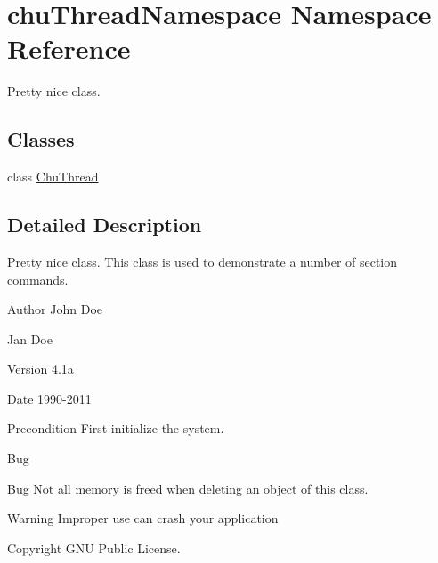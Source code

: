 \hypertarget{namespacechu_thread_namespace}{\section{chu\-Thread\-Namespace Namespace Reference}
\label{namespacechu_thread_namespace}
}


Pretty nice class.  


\subsection*{Classes}
\begin{DoxyCompactItemize}
\item 
class \hyperlink{classchu_thread_namespace_1_1_chu_thread}{Chu\-Thread}
\end{DoxyCompactItemize}


\subsection{Detailed Description}
Pretty nice class. This class is used to demonstrate a number of section commands. \begin{DoxyAuthor}{Author}
John Doe 

Jan Doe 
\end{DoxyAuthor}
\begin{DoxyVersion}{Version}
4.\-1a 
\end{DoxyVersion}
\begin{DoxyDate}{Date}
1990-\/2011 
\end{DoxyDate}
\begin{DoxyPrecond}{Precondition}
First initialize the system. 
\end{DoxyPrecond}
\begin{DoxyRefDesc}{Bug}
\item[\hyperlink{bug__bug000001}{Bug}]Not all memory is freed when deleting an object of this class. \end{DoxyRefDesc}
\begin{DoxyWarning}{Warning}
Improper use can crash your application 
\end{DoxyWarning}
\begin{DoxyCopyright}{Copyright}
G\-N\-U Public License. 
\end{DoxyCopyright}
